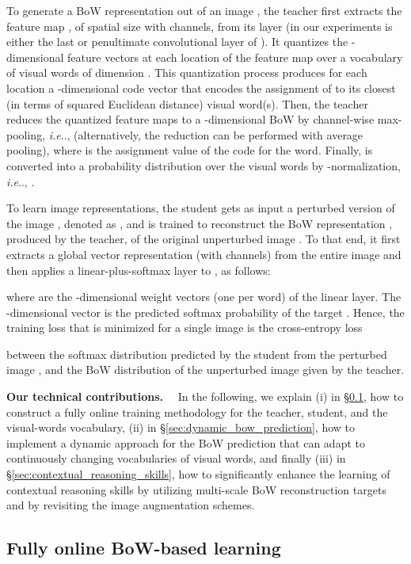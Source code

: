 \documentclass[final]{cvpr}
\makeatletter
\newcommand{\parag}[1]{\smallskip\noindent\textbf{#1}~~}
\DeclareRobustCommand\onedot{\futurelet\@let@token\@onedot}
\def\@onedot{\ifx\@let@token.\else.\null\fi\xspace}
\def\ie{\emph{i.e}\onedot} \def\Ie{\emph{I.e}\onedot}
\makeatother
\begin{document}
To generate a BoW representation  out of an image , the teacher first extracts the feature map , of spatial size  with  channels, from its  layer (in our experiments  is either the last  or penultimate  convolutional layer of ).
It quantizes the -dimensional feature vectors  at each location  of the feature map over a vocabulary  of  visual words of dimension .
This quantization process produces for each location  a -dimensional code vector  that encodes the assignment of  to its closest (in terms of squared Euclidean distance) visual word(s).
Then, the teacher reduces the quantized feature maps  to a -dimensional BoW  by channel-wise max-pooling, \ie, 
 (alternatively, the reduction can be performed with average pooling), where  is the assignment value of the code  for the  word.
Finally,  is converted into a probability distribution over the visual words by -normalization, \ie, 
.

To learn image representations, the student gets as input a perturbed version of the image , denoted as , and is trained to reconstruct the BoW representation , produced by the teacher, of the original unperturbed image .
To that end, it first extracts a global vector representation  (with  channels) from the entire image  and then applies a linear-plus-softmax layer to 
, 
as follows:

where  are the -dimensional weight vectors (one per word) of the linear layer.
The -dimensional vector  is the predicted softmax probability of the target . 
Hence, the training loss that is minimized for a single image  is the cross-entropy loss

between the softmax distribution  predicted by the student from the perturbed image , and the BoW distribution  of the unperturbed image  given by the teacher.

\parag{Our technical contributions.}
In the following, we explain 
(i) in \S\ref{sec:full_online_training}, how to construct a fully online training methodology for the teacher, student, and the visual-words vocabulary, 
(ii) in \S\ref{sec:dynamic_bow_prediction}, how to implement a dynamic approach for the BoW prediction that can adapt to continuously changing vocabularies of visual words, and finally 
(iii) in \S\ref{sec:contextual_reasoning_skills}, how to significantly enhance the learning of contextual reasoning skills by utilizing multi-scale BoW reconstruction targets and by revisiting the image augmentation schemes. 


\subsection{Fully online BoW-based learning} \label{sec:full_online_training}
\end{document}
